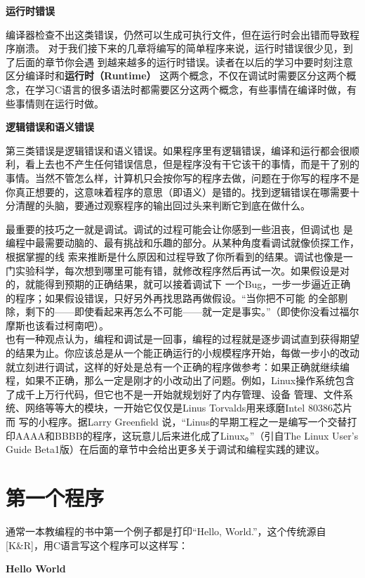 \documentclass[12pt]{book}
\begin{document}
\textbf{运行时错误}

编译器检查不出这类错误，仍然可以生成可执行文件，但在运行时会出错而导致程序崩溃。
对于我们接下来的几章将编写的简单程序来说，运行时错误很少见，到了后面的章节你会遇
到越来越多的运行时错误。读者在以后的学习中要时刻注意区分编译时和\textbf{运行时（Runtime）}
这两个概念，不仅在调试时需要区分这两个概念，在学习C语言的很多语法时都需要区分这两个概念，有些事情在编译时做，有些事情则在运行时做。

\textbf{逻辑错误和语义错误}

第三类错误是逻辑错误和语义错误。如果程序里有逻辑错误，编译和运行都会很顺利，看上去也不产生任何错误信息，但是程序没有干它该干的事情，而是干了别的事情。当然不管怎么样，计算机只会按你写的程序去做，问题在于你写的程序不是你真正想要的，这意味着程序的意思（即语义）是错的。找到逻辑错误在哪需要十分清醒的头脑，要通过观察程序的输出回过头来判断它到底在做什么。

最重要的技巧之一就是调试。调试的过程可能会让你感到一些沮丧，但调试也
是编程中最需要动脑的、最有挑战和乐趣的部分。从某种角度看调试就像侦探工作，根据掌握的线
索来推断是什么原因和过程导致了你所看到的结果。调试也像是一门实验科学，每次想到哪里可能有错，就修改程序然后再试一次。如果假设是对的，就能得到预期的正确结果，就可以接着调试下
一个Bug，一步一步逼近正确的程序；如果假设错误，只好另外再找思路再做假设。``当你把不可能
的全部剔除，剩下的------即使看起来再怎么不可能------就一定是事实。''（即使你没看过福尔摩斯也该看过柯南吧）。\\
也有一种观点认为，编程和调试是一回事，编程的过程就是逐步调试直到获得期望的结果为止。你应该总是从一个能正确运行的小规模程序开始，每做一步小的改动就立刻进行调试，这样的好处是总有一个正确的程序做参考：如果正确就继续编程，如果不正确，那么一定是刚才的小改动出了问题。例如，Linux操作系统包含了成千上万行代码，但它也不是一开始就规划好了内存管理、设备
管理、文件系统、网络等等大的模块，一开始它仅仅是Linus
Torvalds用来琢磨Intel 80386芯片而 写的小程序。据Larry Greenfield
说，``Linus的早期工程之一是编写一个交替打印AAAA和BBBB的程序，这玩意儿后来进化成了Linux。''（引自The
Linux User's Guide
Beta1版）在后面的章节中会给出更多关于调试和编程实践的建议。


\section{第一个程序}

通常一本教编程的书中第一个例子都是打印``Hello,
World.''，这个传统源自{[}K\&R{]}，用C语言写这个程序可以这样写：

\textbf{Hello World}
\end{document}
